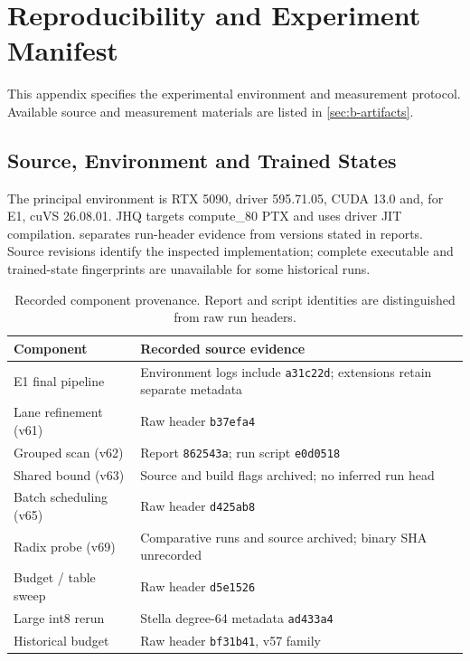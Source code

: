 \chapter{Reproducibility and Experiment Manifest}
\label{app:reproducibility}

This appendix specifies the experimental environment and measurement
protocol. Available source and measurement materials are listed in
\cref{sec:b-artifacts}.

\section{Source, Environment and Trained States}

The principal environment is RTX 5090, driver 595.71.05, CUDA 13.0 and,
for E1, cuVS 26.08.01. JHQ targets compute\_80 PTX and uses driver JIT
compilation.  separates run-header evidence from
versions stated in reports. Source revisions identify the inspected implementation; complete executable
and trained-state fingerprints are unavailable for some historical runs.

\begin{table}[tbp]
\centering
\caption[Component and run provenance]{Recorded component provenance. Report and script identities
are distinguished from raw run headers.}
\label{tab:a-components}
\footnotesize\setlength{\tabcolsep}{4pt}
\begin{tabularx}{\linewidth}{@{}>{\raggedright\arraybackslash}p{.34\linewidth}>{\raggedright\arraybackslash}X@{}}
\toprule
Component & Recorded source evidence \\
\midrule
E1 final pipeline & Environment logs include \texttt{a31c22d}; extensions retain separate metadata \\
Lane refinement (v61) & Raw header \texttt{b37efa4} \\
Grouped scan (v62) & Report \texttt{862543a}; run script \texttt{e0d0518} \\
Shared bound (v63) & Source and build flags archived; no inferred run head \\
Batch scheduling (v65) & Raw header \texttt{d425ab8} \\
Radix probe (v69) & Comparative runs and source archived; binary SHA unrecorded \\
Budget / table sweep & Raw header \texttt{d5e1526} \\
Large int8 rerun & Stella degree-64 metadata \texttt{ad433a4} \\
Historical budget & Raw header \texttt{bf31b41}, v57 family \\
\bottomrule
\end{tabularx}
\end{table}


